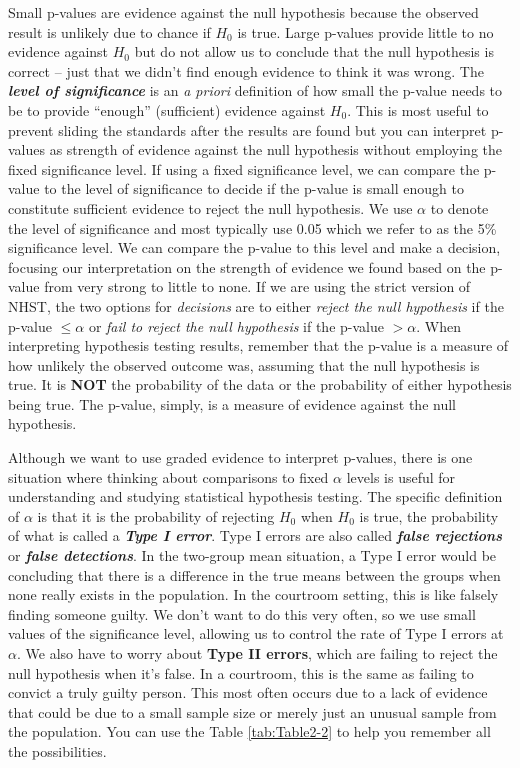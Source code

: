 \documentclass[
]{book}
\begin{document}
\indent Small p-values are evidence against the null hypothesis
because the observed
result is unlikely due to chance if \(H_0\) is true. Large p-values provide
little to no evidence against \(H_0\) but do not allow us to conclude that the null
hypothesis is correct -- just that we didn't find enough evidence to think it
was wrong. The \textbf{\emph{level of significance}} is an \emph{a priori} definition of
how small the p-value needs to be to provide ``enough'' (sufficient) evidence
against \(H_0\). This is most useful to prevent sliding the standards after
the results are found but you can interpret p-values as strength of evidence against the null hypothesis without employing the fixed significance level. If using a fixed significance level, we can compare the p-value to the level of significance to
decide if the p-value is small enough to constitute sufficient evidence to
reject the null hypothesis. We use \(\alpha\) to denote the level of
significance and most typically use 0.05 which we refer to as the 5\%
significance level. We can compare the p-value to this level and make a
decision, focusing our interpretation on the strength of evidence we found
based on the p-value from very strong to little to none.
If we are using the strict version of NHST, the two options for \emph{decisions} are
to either \emph{reject the null hypothesis}
if the p-value \(\le \alpha\) or \emph{fail to reject the null hypothesis} if the
p-value \(> \alpha\). When interpreting hypothesis testing results, remember
that the p-value is a measure of how unlikely the observed outcome was,
assuming that the null hypothesis is true. It is \textbf{NOT} the probability of
the data or the probability of either hypothesis being true. The p-value,
simply, is a measure of evidence against the null hypothesis.

\indent Although we want to use graded evidence to interpret p-values, there
is one situation where thinking about comparisons to fixed \(\alpha\) levels is
useful for understanding and studying statistical hypothesis testing. The
specific definition of \(\alpha\) is that it is the probability of rejecting
\(H_0\) when \(H_0\) is true, the probability of what is called a
\textbf{\emph{Type I error}}.  Type I errors are also called \textbf{\emph{false rejections}} or
\textbf{\emph{false detections}}. In the two-group mean situation, a Type I error would
be concluding that there
is a difference in the true means between the groups when none really exists
in the population. In the courtroom setting, this is like falsely finding
someone guilty. We don't want to do this very often, so we use small values
of the significance level, allowing us to control the rate of Type I errors
at \(\alpha\).  We also have to worry about \textbf{Type II errors},  which are failing
to reject the null hypothesis when it's false. In a courtroom, this is the same
as failing to convict a truly guilty person. This most often occurs due to a
lack of evidence that could be due to a small sample size or merely just an
unusual sample from the population. You can use the Table \ref{tab:Table2-2}
to help you remember all the possibilities.
\end{document}
